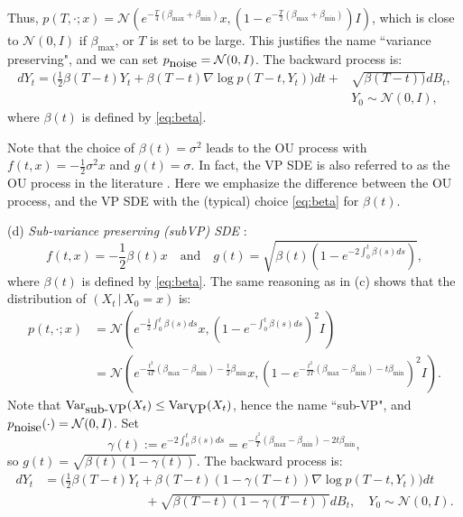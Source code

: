 \documentclass[letterpaper,11pt,reqno]{amsart}
\DeclareMathOperator\var{Var}
\numberwithin{equation}{section}
\begin{document}
Thus, 
$p(T, \cdot;x) = \mathcal{N}(e^{-\frac{T}{4} (\beta_{\max} + \beta_{\min})} x, (1 - e^{-\frac{T}{2} (\beta_{\max} + \beta_{\min})}) I)$,
which is close to $\mathcal{N}(0, I)$ if $\beta_{\max}$, or $T$ is set to be large. 
This justifies the name ``variance preserving", and
we can set $p_{\tiny \mbox{noise}} = \mathcal{N}(0,I)$.
The backward process is:
\begin{equation}
\label{eq:VPrev}
\begin{aligned}
d Y_t = \bigg(\frac{1}{2} \beta(T-t) Y_t + \beta(T-t) \nabla \log p(T-t, Y_t)\bigg)  dt 
+ & \sqrt{\beta(T-t))} dB_t, \\
& Y_0 \sim \mathcal{N}(0, I),
\end{aligned}
\end{equation}
where $\beta(t)$ is defined by \eqref{eq:beta}.

\quad Note that the choice of $\beta(t) = \sigma^2$ leads to the OU process with $f(t,x) = -\frac{1}{2} \sigma^2 x$ and $g(t) = \sigma$. 
In fact, the VP SDE is also referred to as the OU process 
in the literature \cite{Chen23, LLT22, LLT23}.
Here we emphasize the difference between the OU process,
and the VP SDE with the (typical) choice \eqref{eq:beta} for $\beta(t)$.

\medskip
\noindent
(d) {\em Sub-variance preserving (subVP) SDE} \cite{Song20}:
\begin{equation}
\label{eq:sigbSVP}
f(t,x) = -\frac{1}{2} \beta(t) x \quad \mbox{and} \quad
g(t) = \sqrt{\beta(t) (1 - e^{-2 \int_0^t \beta(s) ds})},
\end{equation}
where $\beta(t)$ is defined by \eqref{eq:beta}.
The same reasoning as in (c) shows that
the distribution of $(X_t\,|\, X_0 = x)$ is:
\begin{equation}
\label{eq:SVPp}
\begin{aligned}
p(t, \cdot;x) & =  \mathcal{N} \left( e^{-\frac{1}{2} \int_0^t \beta(s) ds} x, (1 - e^{-\int_0^t \beta(s) ds})^2 I  \right) \\
& =  \mathcal{N}\left( e^{-\frac{t^2}{4T}(\beta_{\max} - \beta_{\min}) - \frac{t}{2} \beta_{\min}}  x,  
(1 -e^{-\frac{t^2}{2T}(\beta_{\max} - \beta_{\min}) - t \beta_{\min}} )^2 I \right).
\end{aligned}
\end{equation}
Note that $\var_{ \tiny \mbox{sub-VP}}(X_t) \le \var_{ \tiny \mbox{VP}}(X_t)$, 
hence the name ``sub-VP",
and $p_{\tiny \mbox{noise}}(\cdot) = \mathcal{N}(0,I)$.
Set 
$$\gamma(t):= e^{-2 \int_0^t \beta(s) ds} = e^{-\frac{t^2}{T}(\beta_{\max} - \beta_{\min}) - 2t \beta_{\min}},$$
so
$g(t) = \sqrt{\beta(t) (1 - \gamma(t))}$.
The backward process is:
\begin{equation}
\label{eq:SVPrev2}
\begin{aligned}
d Y_t & = \bigg( \frac{1}{2} \beta(T-t) Y_t  + \beta(T-t)(1 - \gamma(T-t)) \nabla \log p(T-t, Y_t)\bigg)  dt \\
& \qquad \qquad \qquad \qquad+ \sqrt{\beta(T-t) (1 - \gamma(T-t))} dB_t, \quad Y_0 \sim \mathcal{N}(0, I).
\end{aligned}
\end{equation}
\end{document}
